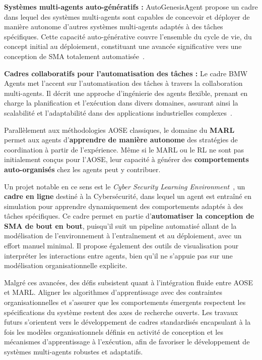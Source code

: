 \textbf{Systèmes multi-agents auto-génératifs :} AutoGenesisAgent propose un cadre dans lequel des systèmes multi-agents sont capables de concevoir et déployer de manière autonome d'autres systèmes multi-agents adaptés à des tâches spécifiques. Cette capacité auto-générative couvre l'ensemble du cycle de vie, du concept initial au déploiement, constituant une avancée significative vers une conception de SMA totalement automatisée~\cite{harper2024autogenesisagent}.

\textbf{Cadres collaboratifs pour l'automatisation des tâches :} Le cadre BMW Agents met l'accent sur l'automatisation des tâches à travers la collaboration multi-agents. Il décrit une approche d'ingénierie des agents flexible, prenant en charge la planification et l'exécution dans divers domaines, assurant ainsi la scalabilité et l'adaptabilité dans des applications industrielles complexes~\cite{crawford2024bmw}.

\vspace{0.5em}

Parallèlement aux méthodologies AOSE classiques, le domaine du \textbf{MARL} permet aux agents d'\textbf{apprendre de manière autonome} des stratégies de coordination à partir de l'expérience. Même si le MARL ou le RL ne sont pas initialement conçus pour l'AOSE, leur capacité à générer des \textbf{comportements auto-organisés} chez les agents peut y contribuer.

Un projet notable en ce sens est le \textit{Cyber Security Learning Environment}~\cite{hammar2023scalable}, un \textbf{cadre en ligne} destiné à la Cybersécurité, dans lequel un agent est entraîné en simulation pour apprendre dynamiquement des comportements adaptés à des tâches spécifiques. Ce cadre permet en partie d'\textbf{automatiser la conception de SMA de bout en bout}, puisqu'il suit un pipeline automatisé allant de la modélisation de l'environnement à l'entraînement et au déploiement, avec un effort manuel minimal. Il propose également des outils de visualisation pour interpréter les interactions entre agents, bien qu'il ne s'appuie pas sur une modélisation organisationnelle explicite.

Malgré ces avancées, des défis subsistent quant à l'intégration fluide entre AOSE et MARL. Aligner les algorithmes d'apprentissage avec des contraintes organisationnelles et s'assurer que les comportements émergents respectent les spécifications du système restent des axes de recherche ouverts. Les travaux futurs s'orientent vers le développement de cadres standardisés encapsulant à la fois les modèles organisationnels définis en activité de conception et les mécanismes d'apprentissage à l'exécution, afin de favoriser le développement de systèmes multi-agents robustes et adaptatifs.


